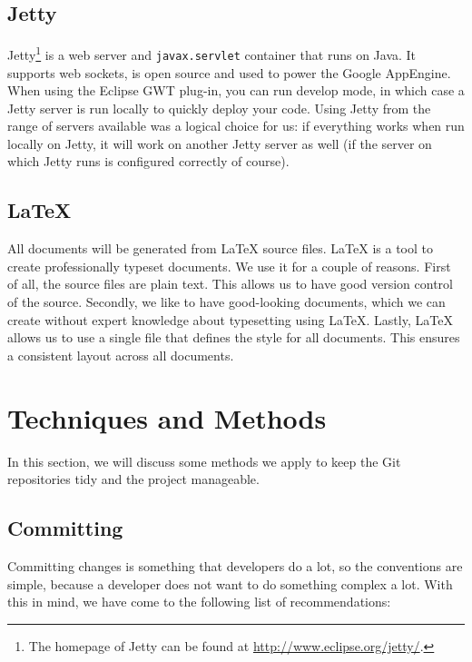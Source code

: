 \subsection{Jetty}
\label{subsec:tools-jetty}
Jetty\footnote{The homepage of Jetty can be found at \url{http://www.eclipse.org/jetty/}.} is a web server and \texttt{javax.servlet} container that runs on Java. It supports web sockets, is open source and used to power the Google AppEngine. When using the Eclipse GWT plug-in, you can run develop mode, in which case a Jetty server is run locally to quickly deploy your code. Using Jetty from the range of servers available was a logical choice for us: if everything works when run locally on Jetty, it will work on another Jetty server as well (if the server on which Jetty runs is configured correctly of course).

\subsection{\LaTeX{}}
\label{subsec:tools-latex}
All documents will be generated from \LaTeX{} source files. \LaTeX{} is a tool to create professionally typeset documents. We use it for a couple of reasons. First of all, the source files are plain text. This allows us to have good version control of the source. Secondly, we like to have good-looking documents, which we can create without expert knowledge about typesetting using \LaTeX{}. Lastly, \LaTeX{} allows us to use a single file that defines the style for all documents. This ensures a consistent layout across all documents.

\section{Techniques and Methods}
In this section, we will discuss some methods we apply to keep the Git repositories tidy and the project manageable.

\subsection{Committing}
Committing changes is something that developers do a lot, so the conventions are simple, because a developer does not want to do something complex a lot. With this in mind, we have come to the following list of recommendations:

